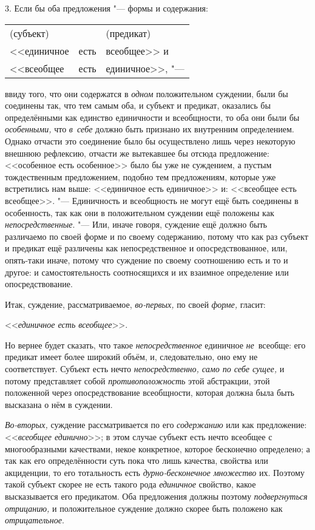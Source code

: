 3. Если бы оба предложения "--- формы и содержания:\label{bkm:bm34a}

\begin{center}
\begin{tabular}{l c l}
(субъект) & \  & (предикат) \\
<<единичное & есть & всеобщее>> и \\
<<всеобщее & есть & единичное>>, "---
\end{tabular}
\end{center}

\noindent ввиду того, что они содержатся в {\em одном} положительном
суждении, были бы соединены так, что тем самым оба, и субъект и предикат,
оказались бы определёнными как единство единичности и всеобщности, то оба
они были бы {\em особенными,} что {\em в~себе}
должно быть признано их внутренним определением. Однако
отчасти это соединение было бы осуществлено лишь через некоторую внешнюю
рефлексию, отчасти же вытекавшее бы отсюда предложение: <<особенное есть
особенное>> было бы уже не суждением, а пустым тождественным предложением,
подобно тем предложениям, которые уже встретились нам выше: <<единичное есть
единичное>> и: <<всеобщее есть всеобщее>>. "--- Единичность и
всеобщность не могут ещё быть соединены в особенность, так как они в
положительном суждении ещё положены как {\em непосредственные}. "---
Или, иначе говоря, суждение ещё должно быть различаемо по
своей форме и по своему содержанию, потому что как раз субъект и предикат
ещё различены как непосредственное и опосредствованное, или, опять-таки
иначе, потому что суждение по своему соотношению есть и то и другое: и
самостоятельность соотносящихся и их взаимное определение или опосредствование.

Итак, суждение, рассматриваемое, {\em во-первых,} по своей {\em форме,} гласит:

<<{\em единичное есть всеобщее}>>.

Но вернее будет сказать, что такое {\em непосредственное} единичное
{\em не}~всеобще: его предикат имеет более широкий объём, и,
следовательно, оно ему не соответствует. Субъект есть нечто
{\em непосредственно, само по себе сущее,} и потому представляет собой
{\em противоположность} этой абстракции, этой положенной через опосредствование
всеобщности, которая должна была быть высказана о нём в суждении.

{\em Во-вторых,} суждение рассматривается по его {\em содержанию} или как
предложение: <<{\em всеобщее единично}>>; в этом случае субъект есть нечто
всеобщее с многообразными качествами, некое конкретное, которое бесконечно
определено; а так как его определённости суть пока что лишь качества, свойства
или акциденции, то его тотальность есть {\em дурно-бесконечное множество} их.
Поэтому такой субъект скорее не есть такого рода {\em единичное} свойство,
какое высказывается его предикатом. Оба предложения должны поэтому
{\em подвергнуться отрицанию,} и положительное суждение должно скорее быть
положено как {\em отрицательное}.


